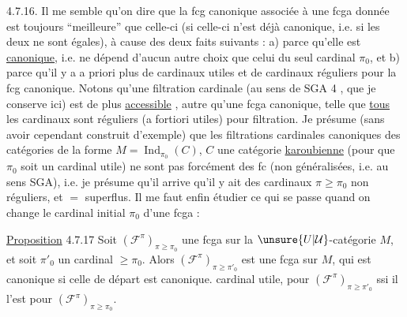 4.7.16. Il me semble qu'on  dire que la
fcg canonique associée à une fcga donnée
est toujours ``meilleure'' que celle-ci (si celle-ci
 n'est  déjà canonique, i.e. si les
deux ne sont égales), à cause des deux
faits suivants : a)  parce qu'elle est \uline{canonique},
i.e. ne dépend d'aucun autre choix que
celui du seul cardinal $\pi_0$, et b) parce
qu'il y a a priori plus de cardinaux
utiles et de cardinaux réguliers pour
la fcg canonique. 
Notons qu'une filtration cardinale (au sens
de SGA 4 , que je conserve ici)  est de plus
\uline{accessible} ,  autre qu'une 
fcga canonique, telle que \uline{tous} les
cardinaux sont réguliers (a fortiori utiles)
pour  filtration. Je présume 
(sans avoir cependant construit d'exemple)
que les filtrations cardinales canoniques
des catégories de la forme $M=\operatorname{Ind}_{\pi_0}(C)$,
$C$ une  catégorie \uline{karoubienne} (pour
que $\pi_0$ soit un cardinal utile) 
ne sont pas forcément des fc (non généralisées, i.e. au sens SGA), i.e. je présume
qu'il arrive qu'il y ait des cardinaux $\pi\geq\pi_0$
non réguliers, et $=$ superflus.
Il me faut enfin étudier ce qui se
passe quand on change le cardinal initial
$\pi_0$ d'une fcga :

\uline{Proposition} 4.7.17 Soit $(\mathcal F^\pi)_{\pi\geq\pi_0}$ une fcga
sur la $\unsure{U|\mathcal U}$-catégorie $M$, et soit $\pi'_0$ un
cardinal $\geq\pi_0$. Alors $(\mathcal F^\pi)_{\pi\geq\pi'_0}$ est une
fcga sur $M$, qui est canonique si
celle de départ  est canonique. 
 cardinal  utile,  pour
$(\mathcal F^\pi)_{\pi\geq\pi'_0}$ ssi il l'est pour $(\mathcal F^\pi)_{\pi\geq\pi_0}$.
%

